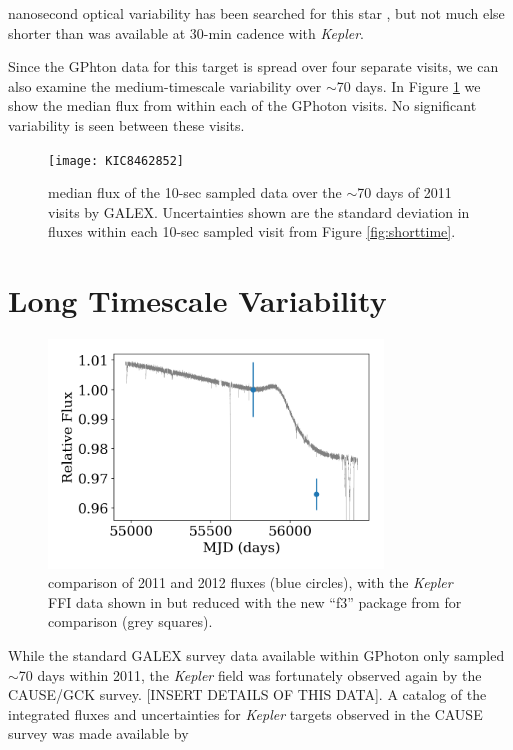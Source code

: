 \documentclass[twocolumn]{aastex6}
\newcommand{\Kepler}{\textsl{Kepler}\xspace}
\begin{document}
nanosecond optical variability has been searched for this star \citep{abeysekara2016}, but not much else shorter than was available at 30-min cadence with \Kepler.



Since the GPhton data for this target is spread over four separate visits, we can also examine the medium-timescale variability over $\sim$70 days. In Figure \ref{fig:medtime} we show the median flux from within each of the GPhoton visits. No significant variability is seen between these visits.

\begin{figure}[!ht]
\centering
\texttt{[image: KIC8462852]}
\caption{median flux of the 10-sec sampled data over the $\sim$70 days of 2011 visits by GALEX. Uncertainties shown are the standard deviation in fluxes within each 10-sec sampled visit from Figure \ref{fig:shorttime}.
}
\label{fig:medtime}
\end{figure}





\section{Long Timescale Variability}
\label{sec:long}

\begin{figure}[!ht]
\centering
\includegraphics[width=3.5in]{KIC8462852_compare}
\caption{comparison of 2011 and 2012 fluxes (blue circles), with the \Kepler FFI data shown in \citet{montet2016} but reduced with the new ``f3'' package from \citet{montet2017} for comparison (grey squares).}
\label{fig:longtime}
\end{figure}


While the standard GALEX survey data available within GPhoton only sampled $\sim$70 days within 2011, the \Kepler field was fortunately observed again by the CAUSE/GCK survey. [INSERT DETAILS OF THIS DATA]. A catalog of the integrated fluxes and uncertainties for \Kepler targets observed in the CAUSE survey was made available by \citet{olmedo2015}
\end{document}
